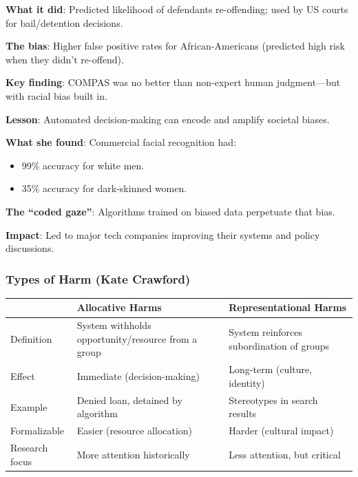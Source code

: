 \begin{exbox}
\textbf{What it did}: Predicted likelihood of defendants re-offending; used by US courts for bail/detention decisions.

\textbf{The bias}: Higher false positive rates for African-Americans (predicted high risk when they didn't re-offend).

\textbf{Key finding}: COMPAS was no better than non-expert human judgment---but with racial bias built in.

\textbf{Lesson}: Automated decision-making can encode and amplify societal biases.
\end{exbox}

\begin{exbox}
\textbf{What she found}: Commercial facial recognition had:
\begin{itemize}
  \item 99\% accuracy for white men.
  \item 35\% accuracy for dark-skinned women.
\end{itemize}

\textbf{The ``coded gaze''}: Algorithms trained on biased data perpetuate that bias.

\textbf{Impact}: Led to major tech companies improving their systems and policy discussions.
\end{exbox}

\subsubsection*{Types of Harm (Kate Crawford)}

\begin{center}
\renewcommand{\arraystretch}{1.3}
\begin{tabular}{@{} l p{5cm} p{5cm} @{}}
\toprule
& \textbf{Allocative Harms} & \textbf{Representational Harms} \\
\midrule
Definition & System withholds opportunity/resource from a group & System reinforces subordination of groups \\
Effect & Immediate (decision-making) & Long-term (culture, identity) \\
Example & Denied loan, detained by algorithm & Stereotypes in search results \\
Formalizable & Easier (resource allocation) & Harder (cultural impact) \\
Research focus & More attention historically & Less attention, but critical \\
\bottomrule
\end{tabular}
\end{center}


